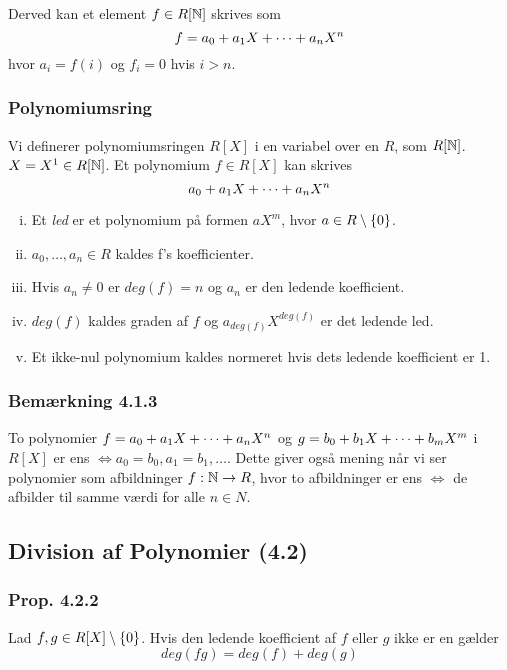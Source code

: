 Derved kan et element $f \in R[\mathbb{N}]$ skrives som
\begin{equation*}
  f = a_0 + a_1 X + \cdots + a_n X^n
\end{equation*}
hvor $a_i = f(i)$ og $f_i = 0$ hvis $i > n$.

\subsubsection{Polynomiumsring}
\label{Polynomiumsring}
Vi definerer polynomiumsringen $R[X]$ i en variabel over en $R$,
som $R[\mathbb{N}]$. $X = X^1 \in R[\mathbb{N}]$. Et polynomium $f \in R[X]$ kan skrives
\begin{equation*}
  a_0 + a_1 X + \cdots + a_n X^n
\end{equation*}
\begin{enumerate}[(i)]
  \item Et \textit{led} er et polynomium på formen $aX^m$, hvor $a \in
  R\setminus \{ 0 \}$.
  \item $a_0,\ldots,a_n \in R$ kaldes f's koefficienter.
  \item Hvis $a_n \neq 0$ er $deg(f) = n$ og $a_n$ er den ledende koefficient.
  \item $deg(f)$ kaldes graden af $f$ og $a_{deg(f)}X^{deg(f)}$ er det ledende
  led.
  \item Et ikke-nul polynomium kaldes normeret hvis dets ledende koefficient er
  1.
\end{enumerate} 

\subsubsection{Bemærkning 4.1.3}
\label{Bemaerkning 4.1.3}
To polynomier $f = a_0 + a_1 X + \cdots + a_n X^n$ og $g = b_0 + b_1 X + \cdots + b_m X^m$ i $R[X]$ er ens $\iff a_0 =
b_0, a_1=b_1,\ldots$. Dette giver også mening når vi ser polynomier som
afbildninger $f: \mathbb{N} \rightarrow R$, hvor to afbildninger er ens $\iff$ de
afbilder til samme værdi for alle $n \in N$.

\subsection{Division af Polynomier (4.2)}
\label{Division af Polynomier}
\subsubsection{Prop. 4.2.2}
\label{Prop. 4.2.2}
Lad $f, g \in R[X] \setminus \{ 0 \}$. Hvis den ledende koefficient af $f$ eller
$g$ ikke er en  gælder
\begin{equation*}
  deg(fg) = deg(f) + deg(g)
\end{equation*}

